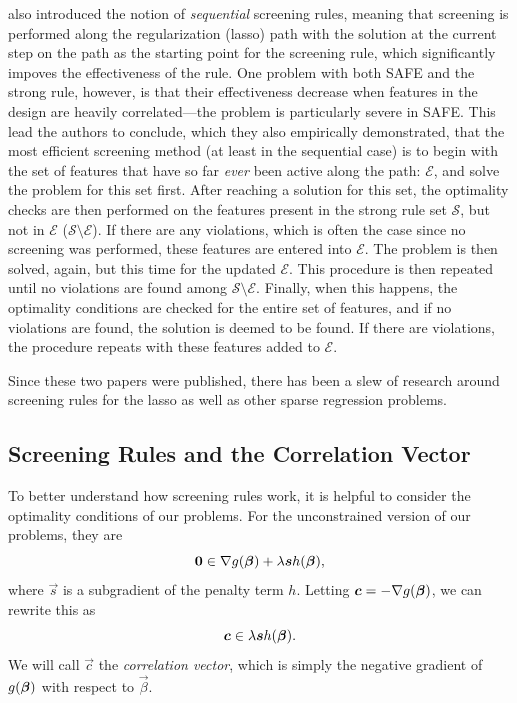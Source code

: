 \textcite{tibshirani2012} also introduced the notion of \emph{sequential} screening rules, meaning that screening is performed along the regularization (lasso) path with the solution at the current step on the path as the starting point for the screening rule, which significantly impoves the effectiveness of the rule. One problem with both SAFE and the strong rule, however, is that their effectiveness decrease when features in the design are heavily correlated---the problem is particularly severe in SAFE. This lead the authors to conclude, which they also empirically demonstrated, that the most efficient screening method (at least in the sequential case) is to begin with the set of features that have so far \emph{ever} been active along the path: \(\mathcal{E}\), and solve the problem for this set first. After reaching a solution for this set, the optimality checks are then performed on the features present in the strong rule set \(\mathcal{S}\), but not in \(\mathcal{E}\) (\(\mathcal{S} \setminus \mathcal{E}\)). If there are any violations, which is often the case since no screening was performed, these features are entered into \(\mathcal{E}\). The problem is then solved, again, but this time for the updated \(\mathcal{E}\). This procedure is then repeated until no violations are found among \(\mathcal{S} \setminus \mathcal{E}\). Finally, when this happens, the optimality conditions are checked for the entire set of features, and if no violations are found, the solution is deemed to be found. If there are violations, the procedure repeats with these features added to \(\mathcal{E}\).

Since these two papers were published, there has been a slew of research around screening rules for the lasso as well as other sparse regression problems.

\subsection{Screening Rules and the Correlation Vector}


To better understand how screening rules work, it is helpful to consider the optimality conditions of our problems. For the unconstrained version of our problems, they are
\begin{equation*}
  \boldsymbol{0} \in \nabla g(\boldsymbol{\beta}) + \lambda \boldsymbol{s} h(\boldsymbol{\beta}),
\end{equation*}
where \(\vec{s}\) is a subgradient of the penalty term \(h\). Letting \(\boldsymbol{c} = -\nabla g(\boldsymbol{\beta})\), we can rewrite this as
\[
  \boldsymbol{c} \in \lambda \boldsymbol{s} h(\boldsymbol{\beta}).
\]
We will call \(\vec{c}\) the \emph{correlation vector}, which is simply the negative gradient of \(g(\boldsymbol{\beta})\) with respect to \(\vec{\beta}\).

